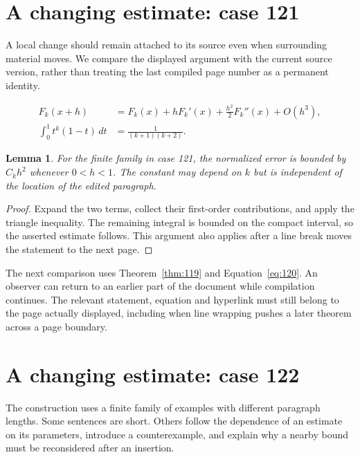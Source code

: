 \documentclass[a4paper,10pt]{article}
\newtheorem{lemma}[theorem]{Lemma}
\begin{document}
\lipsum[23]

\section{A changing estimate: case 121}\label{unit:120}
A local change should remain attached to its source even when surrounding material moves. We compare the displayed argument with the current source version, rather than treating the last compiled page number as a permanent identity.

\lipsum[1-2]
\begin{align}\label{eq:120}
 F_k(x+h)&=F_k(x)+hF_k'(x)+\frac{h^2}{2}F_k''(x)+O(h^3),\\
 \int_0^1 t^k(1-t)\,dt&=\frac{1}{(k+1)(k+2)}.
\end{align}
\begin{lemma}\label{thm:120}
For the finite family in case 121, the normalized error is bounded by $C_k h^2$ whenever $0<h<1$. The constant may depend on $k$ but is independent of the location of the edited paragraph.
\end{lemma}
\begin{proof}
Expand the two terms, collect their first-order contributions, and apply the
triangle inequality. The remaining integral is bounded on the compact interval,
so the asserted estimate follows. This argument also applies after a line break
moves the statement to the next page.
\end{proof}
The next comparison uses Theorem~\ref{thm:119} and Equation~\ref{eq:120}. An observer can return to an earlier part of the document while compilation continues. The relevant statement, equation and hyperlink must still belong to the page actually displayed, including when line wrapping pushes a later theorem across a page boundary.

\lipsum[3]

\section{A changing estimate: case 122}\label{unit:121}
The construction uses a finite family of examples with different paragraph lengths. Some sentences are short. Others follow the dependence of an estimate on its parameters, introduce a counterexample, and explain why a nearby bound must be reconsidered after an insertion.
\end{document}

